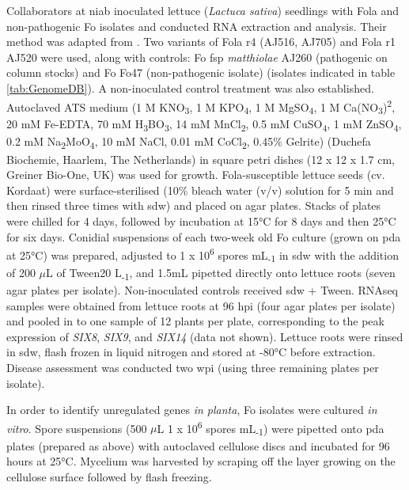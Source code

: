Collaborators at \ac{niab} inoculated lettuce (\textit{Lactuca sativa}) seedlings with \ac{Fola} and non-pathogenic \ac{Fo} isolates and conducted RNA extraction and analysis. Their method was adapted from \textcite{Taylor2016}. Two variants of \ac{Fola} \ac{r4} (AJ516, AJ705) and \ac{Fola} \ac{r1} AJ520 were used, along with controls: \ac{Fo} \ac{fsp} \textit{matthiolae} AJ260 (pathogenic on column stocks) and \ac{Fo} Fo47 (non-pathogenic isolate) (isolates indicated in table \ref{tab:GenomeDB}). A non-inoculated control treatment was also established. Autoclaved ATS medium (1 M KNO\textsubscript{3}, 1 M KPO\textsubscript{4}, 1 M MgSO\textsubscript{4}, 1 M Ca(NO\textsubscript{3})\textsuperscript{2}, 20 mM Fe-EDTA, 70 mM H\textsubscript{3}BO\textsubscript{3}, 14 mM MnCl\textsubscript{2}, 0.5 mM CuSO\textsubscript{4}, 1 mM ZnSO\textsubscript{4}, 0.2 mM Na\textsubscript{2}MoO\textsubscript{4}, 10 mM NaCl, 0.01 mM CoCl\textsubscript{2}, 0.45\% Gelrite) (Duchefa Biochemie, Haarlem, The Netherlands) in square petri dishes (12 x 12 x 1.7 cm, Greiner Bio-One, UK) was used for growth. \ac{Fola}-susceptible lettuce seeds (cv. Kordaat) were surface-sterilised (10\% bleach water (v/v) solution for 5 min and then rinsed three times with \ac{sdw}) and placed on agar plates. Stacks of plates were chilled for 4 days, followed by incubation at 15°C for 8 days and then 25°C for six days. Conidial suspensions of each two-week old \ac{Fo} culture (grown on \ac{pda} at 25°C) was prepared, adjusted to 1 x 10\textsuperscript{6} spores mL\textsubscript{-1} in \ac{sdw} with the addition of 200 \(\mu\)L of Tween20 L\textsubscript{-1}, and 1.5mL pipetted directly onto lettuce roots (seven agar plates per isolate). Non-inoculated controls received \ac{sdw} + Tween. RNAseq samples were obtained from lettuce roots at 96 \ac{hpi} (four agar plates per isolate) and pooled in to one sample of 12 plants per plate, corresponding to the peak expression of \textit{SIX8}, \textit{SIX9}, and \textit{SIX14} (data not shown). Lettuce roots were rinsed in \ac{sdw}, flash frozen in liquid nitrogen and stored at -80°C before extraction. Disease assessment was conducted two \ac{wpi} (using three remaining plates per isolate).

In order to identify unregulated genes \textit{in planta}, \ac{Fo} isolates were cultured \textit{in vitro}. Spore suspensions (500 \(\mu\)L 1 x 10\textsuperscript{6} spores mL\textsubscript{-1}) were pipetted onto \ac{pda} plates (prepared as above) with autoclaved cellulose discs and incubated for 96 hours at 25°C. Mycelium was harvested by scraping off the layer growing on the cellulose surface followed by flash freezing. 

